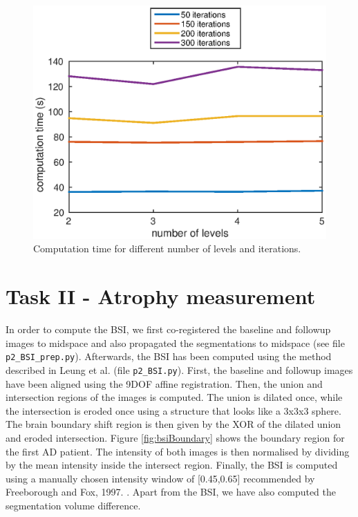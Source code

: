 \documentclass[11pt,a4paper,oneside]{report}
\begin{document}
\begin{figure}
 \centering
 \includegraphics[scale=0.8]{figures/time_params.eps}
 \caption{Computation time for different number of levels and iterations.}
 \label{fig:time}
\end{figure}




\section*{Task II - Atrophy measurement}

In order to compute the BSI, we first co-registered the baseline and followup images to midspace and also propagated the segmentations to midspace (see file \texttt{p2\_BSI\_prep.py}). Afterwards, the BSI has been computed using the method described in Leung et al. \cite{leung2010robust} (file \texttt{p2\_BSI.py}). First, the baseline and followup images have been aligned using the 9DOF affine registration. Then, the union and intersection regions of the images is computed. The union is dilated once, while the intersection is eroded once using a structure that looks like a 3x3x3 sphere. The brain boundary shift region is then given by the XOR of the dilated union and eroded intersection. Figure \ref{fig:bsiBoundary}  shows the boundary region for the first AD patient. The intensity of both images is then normalised by dividing by the mean intensity inside the intersect region. Finally, the BSI is computed using a manually chosen intensity window of [0.45,0.65] recommended by Freeborough and Fox, 1997. \cite{freeborough1997boundary}. Apart from the BSI, we have also computed the segmentation volume difference.
\end{document}
